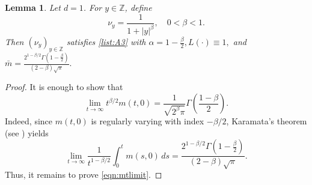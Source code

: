 \documentclass{article}[12pt]
\newtheorem{lemma}{Lemma}[section]
\theoremstyle{definition}
\newcommand{\1}{\mathbbm{1}}
\begin{document}
\begin{lemma}
Let $d=1$. For $y\in\mathbb{Z}$, define
$$
\nu_y=\frac{1}{1+|y|^\beta},
\quad 0<\beta<1.
$$
Then $(\nu_y)_{y\in\mathbb{Z}}$ satisfies \ref{list:A3} with
$\alpha=1-\frac{\beta}{2}, L(\cdot)\equiv 1,$ and $\bar m =\frac{2^{1-\beta/2}\Gamma\left(1-\frac{\beta}{2}\right)}{(2-\beta)\sqrt{\pi}}.$
\label{clm:A3example}
\end{lemma}

\begin{proof}
It is enough to show that 
\begin{equation}
\lim_{t\to\infty}t^{\beta/2}m(t,0) =
\frac{1}{\sqrt{2^\beta\pi}}\Gamma\left(\frac{1-\beta}{2}\right).
\label{eqn:mtlimit}
\end{equation}
Indeed, since $m(t,0)$ is regularly varying with index $-\beta/2$, Karamata's theorem (see \cite{F1971}) yields
$$
\lim_{t\to\infty}\frac{1}{t^{1-\beta/2}}\int_0^t m(s,0)\,ds=
\frac{2^{1-\beta/2}\Gamma\left(1-\frac{\beta}{2}\right)}{(2-\beta)\sqrt{\pi}}.
$$
Thus, it remains to prove \eqref{eqn:mtlimit}.


\end{proof}
\end{document}
